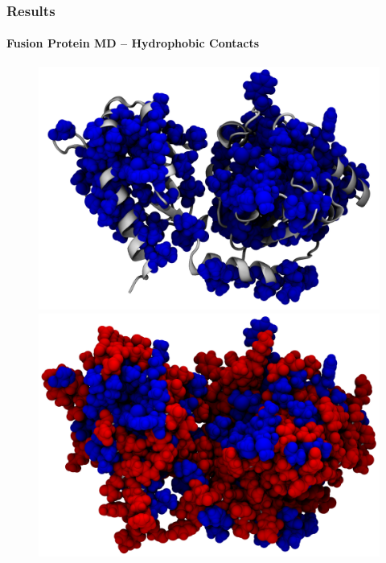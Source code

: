 \documentclass[english]{beamer}
\begin{document}
\begin{frame}
    \frametitle{Results}
    \framesubtitle{Fusion Protein MD -- Hydrophobic Contacts}  

    \vspace{0.06\topmargin}

    \begin{figure}
        \begin{minipage}[]{0.45\linewidth}
            \centering
            \includegraphics[width=\textwidth]{figures/Complex_hydrophobic_core/hydrophobic_core_linker.png}
        \end{minipage}
    \hspace{0.5cm}
        \begin{minipage}[]{0.45\linewidth}
            \centering
            \includegraphics[width=\textwidth]{figures/Complex_hydrophobic_core/protein.png}
        \end{minipage}
    \end{figure}     
 
    
\end{frame}       
\end{document}
